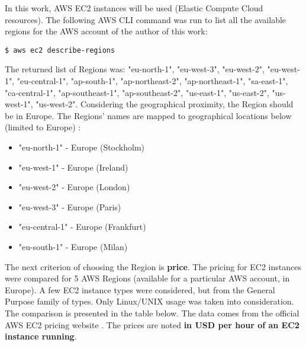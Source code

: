 In this work, AWS EC2 instances will be used (Elastic Compute Cloud resources). The following AWS CLI command was run to list all the available regions for the AWS account of the author of this work:
\begin{lstlisting}[basicstyle=\small,caption={A command of AWS CLI tool used to list all the available regions (for an AWS account)}]
$ aws ec2 describe-regions
\end{lstlisting}

The returned list of Regions was: "eu-north-1", "eu-west-3", "eu-west-2", "eu-west-1", "eu-central-1", "ap-south-1", "ap-northeast-2", "ap-northeast-1", "sa-east-1", "ca-central-1", "ap-southeast-1", "ap-southeast-2", "us-east-1", "us-east-2", "us-west-1", "us-west-2". Considering the geographical proximity, the Region should be in Europe. The Regions' names are mapped to geographical locations below (limited to Europe) \cite{aws-region-map}:
\begin{itemize}
\item "eu-north-1" - Europe (Stockholm)
\item "eu-west-1" - Europe (Ireland)
\item "eu-west-2" - Europe (London)
\item "eu-west-3" - Europe (Paris)
\item "eu-central-1" - Europe (Frankfurt)
\item "eu-south-1" - Europe (Milan)
\end{itemize}

The next criterion of choosing the Region is \textbf{price}. The pricing for EC2 instances were compared for 5 AWS Regions (available for a particular AWS account, in Europe). A few EC2 instance types were considered, but from the General Purpose family of types. Only Linux/UNIX usage was taken into consideration. The comparison is presented in the table below. The data comes from the official AWS EC2 pricing website \cite{ec2-pricing}. The prices are noted \textbf{in USD per hour of an EC2 instance running}.

